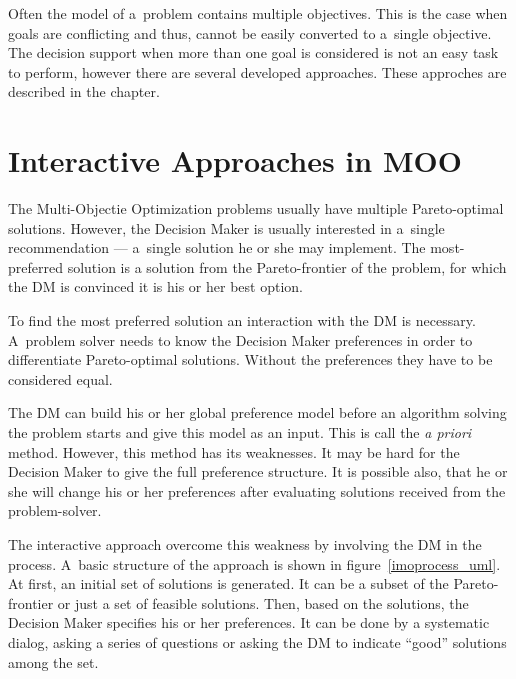 Often the model of a~problem contains multiple objectives. This is the case
when goals are conflicting and thus, cannot be easily converted to a~single
objective. The decision support when more than one goal is considered is not
an easy task to perform, however there are several developed approaches. These
approches are described in the chapter.

\section{Interactive Approaches in MOO}
\label{sec_ia_in_moo}

The Multi-Objectie Optimization problems usually have multiple Pareto-optimal
solutions. However, the Decision Maker is usually interested in a~single
recommendation --- a~single solution he or she may implement. The
most-preferred solution is a solution from the Pareto-frontier of the problem,
for which the DM is convinced it is his or her best option.

To find the most preferred solution an interaction with the DM is
necessary. A~problem solver needs to know the Decision Maker preferences in
order to differentiate Pareto-optimal solutions. Without the preferences they
have to be considered equal.

The DM can build his or her global preference model before an algorithm
solving the problem starts and give this model as an input. This is call the
\textit{a priori} method. However, this method has its weaknesses. It may be
hard for the Decision Maker to give the full preference structure. It is
possible also, that he or she will change his or her preferences after
evaluating solutions received from the problem-solver. 

The interactive approach overcome this weakness by involving the DM in the
process. A~basic structure of the approach is shown in
figure~\ref{imoprocess_uml}. At first, an initial set of solutions is
generated. It can be a subset of the Pareto-frontier or just a set of feasible
solutions. Then, based on the solutions, the Decision Maker specifies his or
her preferences. It can be done by a systematic dialog, asking a series of
questions or asking the DM to indicate ``good'' solutions among the set.


